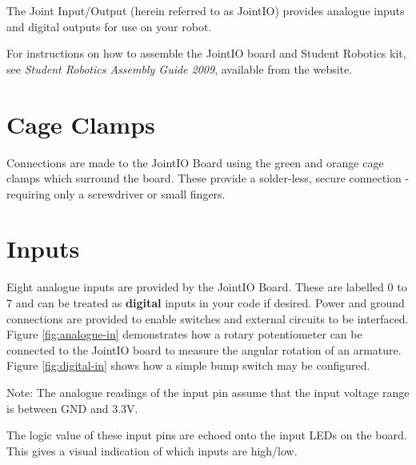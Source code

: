 \documentclass[a4paper, 12pt]{article}
\begin{document}
The Joint Input/Output (herein referred to as JointIO) provides analogue inputs and digital outputs for use on your robot.  

For instructions on how to assemble the JointIO board and Student Robotics kit, see \textit{Student Robotics Assembly Guide 2009}, available from the website.


\section{Cage Clamps}
Connections are made to the JointIO Board using the green and orange cage clamps which surround the board. These provide a solder-less, secure connection - requiring only a screwdriver or small fingers. 
\newpage

\section{Inputs}
Eight analogue inputs are provided by the JointIO Board. These are labelled 0 to 7 and can be treated as \textbf{digital} inputs in your code if desired. Power and ground connections are provided to enable switches and external circuits to be interfaced. Figure \ref{fig:analogue-in} demonstrates how a rotary potentiometer can be connected to the JointIO board to measure the angular rotation of an armature. Figure \ref{fig:digital-in} shows how a simple bump switch may be configured.

Note: The analogue readings of the input pin assume that the input voltage range is between GND and 3.3V. 

The logic value of these input pins are echoed onto the input LEDs on the board. This gives a visual indication of which inputs are high/low.
\end{document}
